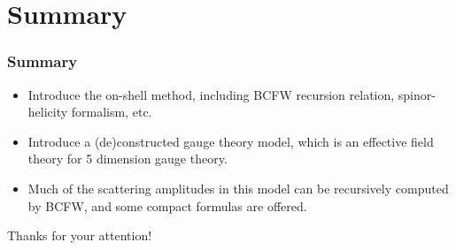 \documentclass{beamer}
\begin{document}
\section{Summary}
\begin{frame}
    \frametitle{Summary}
    \begin{itemize}
        \item Introduce the on-shell method, including BCFW recursion relation, spinor-helicity formalism, etc.
        \item Introduce a (de)constructed gauge theory model, which is an effective field theory for 5 dimension gauge theory.
        \item Much of the scattering amplitudes in this model can be recursively computed by BCFW, and some compact formulas are offered.
    \end{itemize}
\end{frame}
\begin{frame} 
    \centering
    \Huge Thanks for your attention!
\end{frame} 
\appendix
\end{document}
